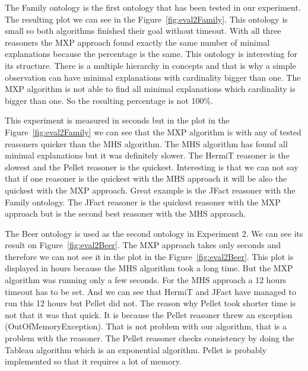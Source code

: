 \documentclass[12pt,a4paper]{article}
\begin{document}
The Family ontology is the first ontology that has been tested in our experiment. The resulting plot we can see in the Figure~\ref{fig:eval2Family}. This ontology is small so both algorithms finished their goal without timeout. With all three reasoners the MXP approach found exactly the same number of minimal explanations because the percentage is the same. This ontology is interesting for its structure. There is a multiple hierarchy in concepts and that is why a simple observation can have minimal explanations with cardinality bigger than one. The MXP algorithm is not able to find all minimal explanations which cardinality is bigger than one. So the resulting percentage is not 100\%. 

This experiment is measured in seconds but in the plot in the Figure~\ref{fig:eval2Family} we can see that the MXP algorithm is with any of tested reasoners quicker than the MHS algorithm. The MHS algorithm has found all minimal explanations but it was definitely slower. The HermiT reasoner is the slowest and the Pellet reasoner is the quickest. Interesting is that we can not say that if one reasoner is the quickest with the MHS approach it will be also the quickest with the MXP approach. Great example is the JFact reasoner with the Family ontology. The JFact reasoner is the quickest reasoner with the MXP approach but is the second best reasoner with the MHS approach.

The Beer ontology is used as the second ontology in Experiment 2. We can see its result on Figure~\ref{fig:eval2Beer}. The MXP approach takes only seconds and therefore we can not see it in the plot in the Figure~\ref{fig:eval2Beer}. This plot is displayed in hours because the MHS algorithm took a long time. But the MXP algorithm was running only a few seconds. For the MHS approach a 12 hours timeout has to be set. And we can see that HermiT and JFact have managed to run this 12 hours but Pellet did not. The reason why Pellet took shorter time is not that it was that quick. It is because the Pellet reasoner threw an exception (OutOfMemoryException). That is not problem with our algorithm, that is a problem with the reasoner. The Pellet reasoner checks consistency by doing the Tableau algorithm which is an exponential algorithm. Pellet is probably implemented so that it requires a lot of memory. 
\end{document}
